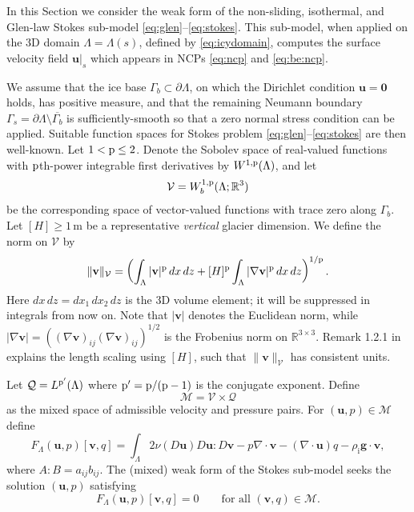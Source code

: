\documentclass[hidelinks,onefignum,onetabnum,final]{siamart220329}  %
\newcommand{\RR}{\mathbb{R}}
\newcommand{\grad}{\nabla}
\newcommand{\Div}{\nabla\cdot}
\newcommand{\bg}{\mathbf{g}}
\newcommand{\bu}{\mathbf{u}}
\newcommand{\bv}{\mathbf{v}}
\newcommand{\bzero}{\bm{0}}
\newcommand{\cQ}{\mathcal{Q}}
\newcommand{\cV}{\mathcal{V}}
\newcommand{\pp}{{\text{\textnormal{p}}}}
\newcommand{\rhoi}{\rho_{\text{i}}}
\begin{document}
In this Section we consider the weak form of the non-sliding, isothermal, and Glen-law Stokes sub-model \eqref{eq:glen}--\eqref{eq:stokes}.  This sub-model, when applied on the 3D domain $\Lambda = \Lambda(s)$, defined by \eqref{eq:icydomain}, computes the surface velocity field $\bu|_s$ which appears in NCPs \eqref{eq:ncp} and \eqref{eq:be:ncp}.

We assume that the ice base $\Gamma_b\subset\partial \Lambda$, on which the Dirichlet condition $\bu=\bzero$ holds, has positive measure, and that the remaining Neumann boundary $\Gamma_s = \partial \Lambda \setminus \overline{\Gamma_b}$ is sufficiently-smooth so that a zero normal stress condition can be applied.  Suitable function spaces for Stokes problem \eqref{eq:glen}--\eqref{eq:stokes} are then well-known.  Let $1 < \pp \le 2$.  Denote the Sobolev space \cite{Evans2010} of real-valued functions with $\pp$th-power integrable first derivatives by $W^{1,\pp}(\Lambda)$, and let
\begin{equation}
\cV = W_b^{1,\pp}(\Lambda; \RR^3) \label{eq:defineV}
\end{equation}
be the corresponding space of vector-valued functions with trace zero along $\Gamma_b$.  Let $[H]\ge 1\,\text{m}$ be a representative \emph{vertical} glacier dimension.  We define the norm on $\cV$ by
\begin{equation}
\|\bv\|_{\cV} = \left(\int_\Lambda |\bv|^\pp\,dx\,dz + [H]^\pp \int_\Lambda |\grad\bv|^\pp\,dx\,dz\right)^{1/\pp}. \label{eq:vnorm}
\end{equation}
Here $dx\,dz = dx_1\,dx_2\,dz$ is the 3D volume element; it will be suppressed in integrals from now on.  Note that $|\bv|$ denotes the Euclidean norm, while $|\grad\bv|=\left((\grad\bv)_{ij} (\grad\bv)_{ij}\right)^{1/2}$ is the Frobenius norm on $\RR^{3\times 3}$.  Remark 1.2.1 in \cite{BoffiBrezziFortin2013} explains the length scaling using $[H]$, such that $\|\bv\|_{\cV}$ has consistent units.

Let $\cQ=L^{\pp'}(\Lambda)$ where $\pp'=\pp/(\pp-1)$ is the conjugate exponent.  Define
\begin{equation}
\mathcal{M} = \cV \times \cQ \label{eq:glenstokes:mixedspace}
\end{equation}
as the mixed space of admissible velocity and pressure pairs.  For $(\bu,p) \in \mathcal{M}$ define
\begin{equation}
F_\Lambda(\bu,p)[\bv,q] = \int_\Lambda 2 \nu(D\bu) D\bu : D\bv - p \Div\bv - (\Div\bu) q - \rhoi \bg \cdot \bv, \label{eq:glenstokes:fcnl}
\end{equation}
where $A:B=a_{ij}b_{ij}$.  The (mixed) weak form of the Stokes sub-model seeks the solution $(\bu,p)$ satisfying
\begin{equation}
F_\Lambda(\bu,p)[\bv,q] = 0 \qquad \text{for all } (\bv,q) \in \mathcal{M}. \label{eq:glenstokes:weak}
\end{equation}
\end{document}

